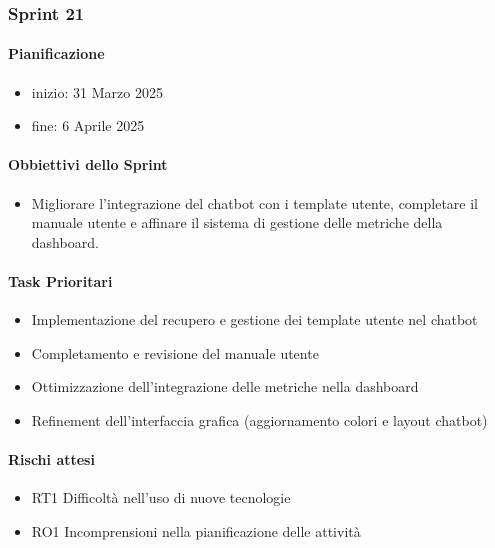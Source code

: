 \documentclass{article}
\begin{document}
            \subsubsection{Sprint 21}
            \paragraph{Pianificazione}
                \begin{itemize}
                    \item inizio: 31 Marzo 2025
                    \item fine: 6 Aprile 2025
                \end{itemize}
            
            \paragraph{Obbiettivi dello Sprint}
            \begin{itemize}
                \item Migliorare l'integrazione del chatbot con i template utente, completare il manuale utente e affinare il sistema di gestione delle metriche della dashboard.
            \end{itemize}
            
            
            \paragraph{Task Prioritari}  
            \begin{itemize}  
                \item Implementazione del recupero e gestione dei template utente nel chatbot  
                \item Completamento e revisione del manuale utente  
                \item Ottimizzazione dell'integrazione delle metriche nella dashboard  
                \item Refinement dell'interfaccia grafica (aggiornamento colori e layout chatbot)  
            \end{itemize}  
            
            \paragraph{Rischi attesi}  
            \begin{itemize}  
                \item RT1 Difficoltà nell’uso di nuove tecnologie  
                \item RO1 Incomprensioni nella pianificazione delle attività  
            \end{itemize}  
            
\end{document}
